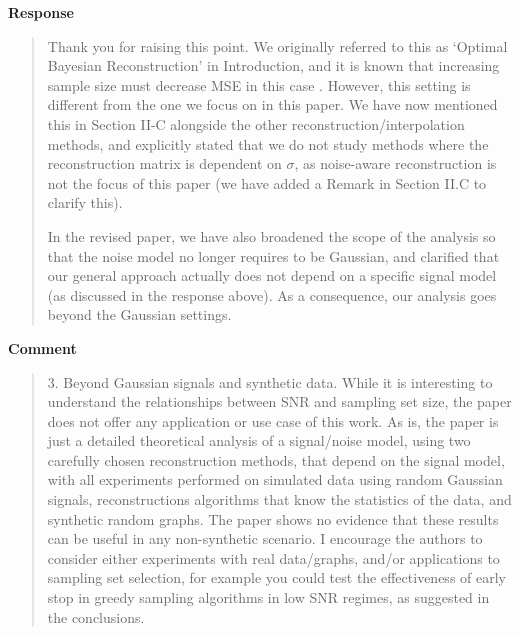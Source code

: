 \documentclass[11pt,onecolumn,journal]{IEEEtran}
\theoremstyle{definition}
\begin{document}
\textbf{Response}
\begin{quote}
Thank you for raising this point. We originally referred to this as `Optimal Bayesian Reconstruction' in Introduction, and it is known that increasing sample size must decrease MSE in this case \cite{chamon2017greedy}. However, this setting is different from the one we focus on in this paper. 
We have now mentioned this in Section II-C alongside the other reconstruction/interpolation methods, and explicitly stated that we do not study methods where the reconstruction matrix is dependent on $\sigma$, as noise-aware reconstruction is not the focus of this paper (we have added a Remark in Section II.C to clarify this).

In the revised paper, we have also broadened the scope of the analysis so that the noise model no longer requires to be Gaussian, and clarified that our general approach actually does not depend on a specific signal model (as discussed in the response above). As a consequence, our analysis goes beyond the Gaussian settings.
\end{quote}

\textbf{Comment}
\begin{quote}
3. Beyond Gaussian signals and synthetic data. While it is interesting to understand the relationships between SNR and sampling set size, the paper does not offer any application or use case of this work. As is, the paper is just a detailed theoretical analysis of a signal/noise model, using two carefully chosen reconstruction methods, that depend on the signal model, with all experiments performed on simulated data using random Gaussian signals,  reconstructions algorithms that know the statistics of the data, and synthetic random graphs.  The paper shows no evidence that these results can be useful in any non-synthetic scenario.
I encourage the authors to consider either experiments with real data/graphs, and/or applications to sampling set selection,  for example you could test the effectiveness of early stop in greedy sampling algorithms in low SNR regimes, as suggested in the conclusions.
\end{quote}
\end{document}
